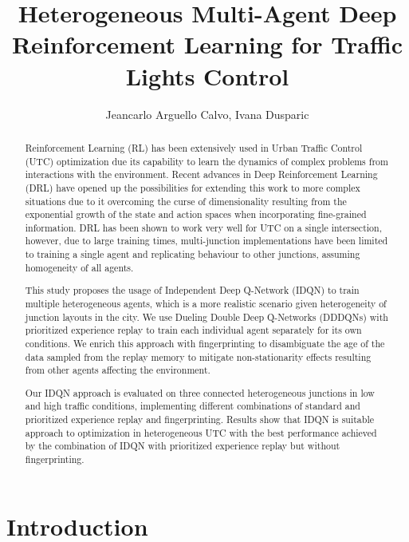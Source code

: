 \documentclass{llncs}
\title{Heterogeneous Multi-Agent Deep Reinforcement Learning for Traffic Lights Control}
\author{Jeancarlo Arguello Calvo, Ivana Dusparic}
\institute{School of Computer Science and Statistics, Trinity College Dublin\\
\email{arguellj@tcd.ie, ivana.dusparic@scss.tcd.ie} }
\begin{document}
\maketitle

\begin{abstract}

Reinforcement Learning (RL) has been extensively used in Urban Traffic Control (UTC) optimization due its capability to learn the dynamics of complex problems from interactions with the environment. Recent advances in Deep Reinforcement Learning (DRL) have opened up the possibilities for extending this work to more complex situations due to it overcoming the curse of dimensionality resulting from the exponential growth of the state and action spaces when incorporating fine-grained information. DRL has been shown to work very well for UTC on a single intersection, however, due to large training times, multi-junction implementations have been limited to training a single agent and replicating behaviour to other junctions, assuming homogeneity of all agents. 

This study proposes the usage of Independent Deep Q-Network (IDQN) to train multiple heterogeneous agents, which is a more realistic scenario given heterogeneity of junction layouts in the city. We use Dueling Double Deep Q-Networks (DDDQNs) with prioritized experience replay to train each individual agent separately for its own conditions. We enrich this approach with fingerprinting to disambiguate the age of the data sampled from the replay memory to mitigate non-stationarity effects resulting from other agents affecting the environment. 

Our IDQN approach is evaluated on three connected heterogeneous junctions in low and high traffic conditions, implementing different combinations of standard and prioritized experience replay and fingerprinting. Results show that IDQN is suitable approach to optimization in heterogeneous UTC with the best performance achieved by the combination of IDQN with prioritized experience replay but without fingerprinting.
\end{abstract}

\section{Introduction}
\end{document}
